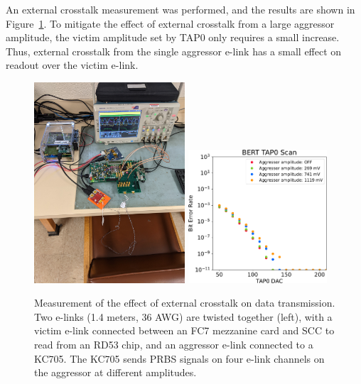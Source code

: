 \documentclass[a4paper,11pt]{article}
\newcommand{\fig}{Figure}
\begin{document}

An external crosstalk measurement was performed, and the results are shown in \fig~\ref{fig:external_crosstalk}.
To mitigate the effect of external crosstalk from a large aggressor amplitude, the victim amplitude set by TAP0 only requires a small increase.
Thus, external crosstalk from the single aggressor e-link has a small effect on readout over the victim e-link.

\begin{figure}[htbp]
\centering
\includegraphics[width=0.50\textwidth,origin=c,angle=270]{../figures/external_crosstalk_setup.jpg}
\qquad
\includegraphics[width=0.46\textwidth,origin=c]{../figures/BERT_TAP0_Scan_External_Crosstalk-crop.pdf}
\caption{
\label{fig:external_crosstalk}
Measurement of the effect of external crosstalk on data transmission.
Two e-links (1.4 meters, 36 AWG) are twisted together (left), with a victim e-link connected between an FC7 mezzanine card and SCC to read from an RD53 chip, and an aggressor e-link connected to a KC705.
The KC705 sends PRBS signals on four e-link channels on the aggressor at different amplitudes.
}
\end{figure}
\end{document}
